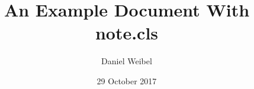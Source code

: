 \documentclass{note}
\title{An Example Document With note.cls}
\author{Daniel Weibel}
\date{29 October 2017}
\begin{document}
\maketitle
\blinddocument
\end{document}
